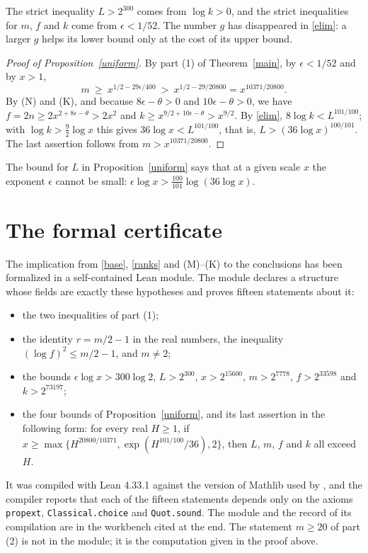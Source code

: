 \documentclass[11pt]{amsart}
\theoremstyle{definition}
\theoremstyle{remark}
\newcommand{\src}[1]{\texttt{#1}}
\newcommand{\tagM}{\textup{(M)}}
\newcommand{\tagN}{\textup{(N)}}
\newcommand{\tagK}{\textup{(K)}}
\begin{document}
The strict inequality $L>2^{300}$ comes from $\log k>0$, and the strict inequalities for $m$, $f$ and $k$ come from $\epsilon<1/52$. The number $g$ has disappeared in \eqref{elim}: a larger $g$ helps its lower bound only at the cost of its upper bound.

\begin{proof}[Proof of Proposition~\ref{uniform}]
By part (1) of Theorem~\ref{main}, by $\epsilon<1/52$ and by $x>1$,
\[
 m\ \ge\ x^{1/2-29\epsilon/400}\ >\ x^{1/2-29/20800}=x^{10371/20800}.
\]
By \tagN{} and \tagK, and because $8\epsilon-\theta>0$ and $10\epsilon-\theta>0$, we have $f=2n\ge2x^{2+8\epsilon-\theta}>2x^2$ and $k\ge x^{9/2+10\epsilon-\theta}>x^{9/2}$. By \eqref{elim}, $8\log k<L^{101/100}$; with $\log k>\frac92\log x$ this gives $36\log x<L^{101/100}$, that is, $L>(36\log x)^{100/101}$. The last assertion follows from $m>x^{10371/20800}$.
\end{proof}

The bound for $L$ in Proposition~\ref{uniform} says that at a given scale $x$ the exponent $\epsilon$ cannot be small: $\epsilon\log x>\frac{100}{101}\log(36\log x)$.

\section{The formal certificate}\label{sec:lean}

The implication from \eqref{base}, \eqref{ranks} and \tagM--\tagK{} to the conclusions has been formalized in a self-contained Lean module. The module declares a structure whose fields are exactly these hypotheses and proves fifteen statements about it:
\begin{itemize}
\item the two inequalities of part (1);
\item the identity $r=m/2-1$ in the real numbers, the inequality $(\log f)^2\le m/2-1$, and $m\ne2$;
\item the bounds $\epsilon\log x>300\log2$, $L>2^{300}$, $x>2^{15600}$, $m>2^{7778}$, $f>2^{33598}$ and $k>2^{73197}$;
\item the four bounds of Proposition~\ref{uniform}, and its last assertion in the following form: for every real $H\ge1$, if $x\ge\max\{H^{20800/10371},\exp(H^{101/100}/36),2\}$, then $L$, $m$, $f$ and $k$ all exceed $H$.
\end{itemize}
It was compiled with Lean 4.33.1 against the version of Mathlib used by \cite{archive}, and the compiler reports that each of the fifteen statements depends only on the axioms \src{propext}, \src{Classical.choice} and \src{Quot.sound}. The module and the record of its compilation are in the workbench cited at the end. The statement $m\ge20$ of part (2) is not in the module; it is the computation given in the proof above.
\end{document}
